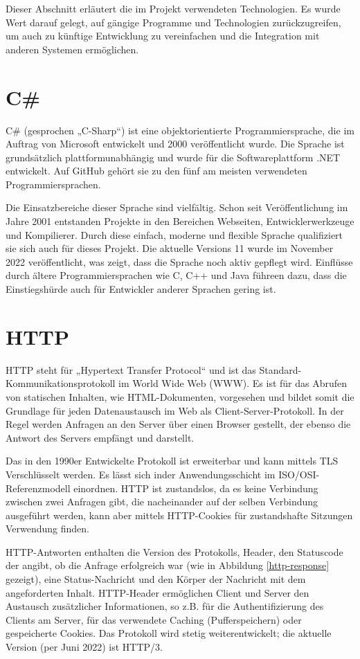 Dieser Abschnitt erläutert die im Projekt verwendeten Technologien.
Es wurde Wert darauf gelegt, auf gängige Programme und Technologien zurückzugreifen, um auch zu künftige Entwicklung zu vereinfachen und die Integration mit anderen Systemen ermöglichen. 

\section{C\#}
C\# (gesprochen „C-Sharp“) ist eine objektorientierte Programmiersprache, die im Auftrag von Microsoft entwickelt und 2000 veröffentlicht wurde.
Die Sprache ist grundsätzlich plattformunabhängig und wurde für die Softwareplattform .NET entwickelt.
Auf GitHub gehört sie zu den fünf am meisten verwendeten Programmiersprachen.\cite{ms-csharp}

Die Einsatzbereiche dieser Sprache sind vielfältig.
Schon seit Veröffentlichung im Jahre 2001 entstanden Projekte in den Bereichen Webseiten, Entwicklerwerkzeuge und Kompilierer.
Durch diese einfach, moderne und flexible Sprache qualifiziert sie sich auch für dieses Projekt.
Die aktuelle Versions 11 wurde im November 2022 veröffentlicht, was zeigt, dass die Sprache noch aktiv gepflegt wird.
Einflüsse durch ältere Programmiersprachen wie C, C++ und Java führeen dazu, dass die Einstiegshürde auch für Entwickler anderer Sprachen gering ist. \cite{dev-csharp}

\section{HTTP}
HTTP steht für „Hypertext Transfer Protocol“ und ist das Standard-Kommunikationsprotokoll im World Wide Web (WWW).
Es ist für das Abrufen von statischen Inhalten, wie HTML-Dokumenten, vorgesehen und bildet somit die Grundlage für jeden Datenaustausch im Web als Client-Server-Protokoll.
In der Regel werden Anfragen an den Server über einen Browser gestellt, der ebenso die Antwort des Servers empfängt und darstellt.

Das  in den 1990er Entwickelte Protokoll ist erweiterbar und kann mittels TLS Verschlüsselt werden. Es lässt sich inder Anwendungsschicht im ISO/OSI-Referenzmodell einordnen.
HTTP ist zustandslos, da es keine Verbindung zwischen zwei Anfragen gibt, die nacheinander auf der selben Verbindung ausgeführt werden, kann aber mittels HTTP-Cookies für zustandshafte Sitzungen Verwendung finden.\cite{mdn-http}

HTTP-Antworten enthalten die Version des Protokolls, Header, den Statuscode der angibt, ob die Anfrage erfolgreich war (wie in Abbildung \vref{http-response} gezeigt), eine Status-Nachricht und den Körper der Nachricht mit dem angeforderten Inhalt.
HTTP-Header ermöglichen Client und Server den Austausch zusätzlicher Informationen, so z.B. für die Authentifizierung des Clients am Server, für das verwendete Caching (Pufferspeichern) oder gespeicherte Cookies.\cite{mdn-http-header}
Das Protokoll wird stetig weiterentwickelt; die aktuelle Version (per Juni 2022) ist HTTP/3.

